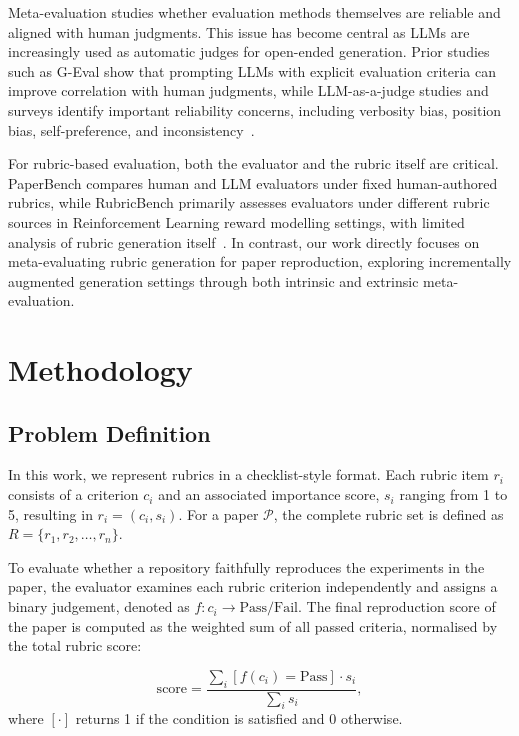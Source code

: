 \documentclass[11pt]{article}
\begin{document}
Meta-evaluation studies whether evaluation methods themselves are reliable and aligned with human judgments. This issue has become central as LLMs are increasingly used as automatic judges for open-ended generation. Prior studies such as G-Eval \citep{liu-etal-2023-g} show that prompting LLMs with explicit evaluation criteria can improve correlation with human judgments, while LLM-as-a-judge studies and surveys identify important reliability concerns, including verbosity bias, position bias, self-preference, and inconsistency~\cite{liu-etal-2023-g,zheng2023judging,gu2025surveyllmasajudge}.

For rubric-based evaluation, both the evaluator and the rubric itself are critical. PaperBench compares human and LLM evaluators under fixed human-authored rubrics, while RubricBench primarily assesses evaluators under different rubric sources in Reinforcement Learning reward modelling settings, with limited analysis of rubric generation itself~\cite{starace2025paperbenchevaluatingaisability,zhou-etal-2026-rubricbench}. In contrast, our work directly focuses on meta-evaluating rubric generation for paper reproduction, exploring incrementally augmented generation settings through both intrinsic and extrinsic meta-evaluation.

\section{Methodology}
\subsection{Problem Definition}
In this work, we represent rubrics in a checklist-style format. Each rubric item $r_i$ consists of a criterion $c_i$ and an associated importance score, $s_i$ ranging from 1 to 5, resulting in $r_i=(c_i,s_i)$. For a paper $\mathcal{P}$, the complete rubric set is defined as $R=\{r_1,r_2,\dots,r_n\}$.

To evaluate whether a repository faithfully reproduces the experiments in the paper, the evaluator examines each rubric criterion independently and assigns a binary judgement, denoted as $f: c_i \rightarrow \text{Pass/Fail}$. The final reproduction score of the paper is computed as the weighted sum of all passed criteria, normalised by the total rubric score:

\begin{equation}
    \mathrm{score}=\frac{\sum_i\left[f(c_i)=\mathrm{Pass}\right]\cdot s_i}{\sum_is_i},
\end{equation}
where $[\cdot]$ returns 1 if the condition is satisfied and 0 otherwise.
\end{document}
